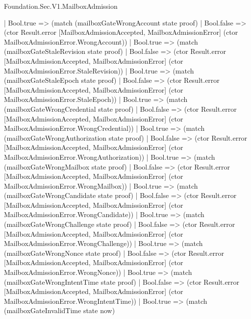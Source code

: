 \begin{lexlean}{Foundation.Sec.V1.MailboxAdmission}
\begin{semanticmodule}
{                        | Bool.true => (match (mailboxGateWrongAccount state proof)
                          | Bool.false => (ctor Result.error [MailboxAdmissionAccepted, MailboxAdmissionError] (ctor MailboxAdmissionError.WrongAccount))
                          | Bool.true => (match (mailboxGateStaleRevision state proof)
                            | Bool.false => (ctor Result.error [MailboxAdmissionAccepted, MailboxAdmissionError] (ctor MailboxAdmissionError.StaleRevision))
                            | Bool.true => (match (mailboxGateStaleEpoch state proof)
                              | Bool.false => (ctor Result.error [MailboxAdmissionAccepted, MailboxAdmissionError] (ctor MailboxAdmissionError.StaleEpoch))
                              | Bool.true => (match (mailboxGateWrongCredential state proof)
                                | Bool.false => (ctor Result.error [MailboxAdmissionAccepted, MailboxAdmissionError] (ctor MailboxAdmissionError.WrongCredential))
                                | Bool.true => (match (mailboxGateWrongAuthorization state proof)
                                  | Bool.false => (ctor Result.error [MailboxAdmissionAccepted, MailboxAdmissionError] (ctor MailboxAdmissionError.WrongAuthorization))
                                  | Bool.true => (match (mailboxGateWrongMailbox state proof)
                                    | Bool.false => (ctor Result.error [MailboxAdmissionAccepted, MailboxAdmissionError] (ctor MailboxAdmissionError.WrongMailbox))
                                    | Bool.true => (match (mailboxGateWrongCandidate state proof)
                                      | Bool.false => (ctor Result.error [MailboxAdmissionAccepted, MailboxAdmissionError] (ctor MailboxAdmissionError.WrongCandidate))
                                      | Bool.true => (match (mailboxGateWrongChallenge state proof)
                                        | Bool.false => (ctor Result.error [MailboxAdmissionAccepted, MailboxAdmissionError] (ctor MailboxAdmissionError.WrongChallenge))
                                        | Bool.true => (match (mailboxGateWrongNonce state proof)
                                          | Bool.false => (ctor Result.error [MailboxAdmissionAccepted, MailboxAdmissionError] (ctor MailboxAdmissionError.WrongNonce))
                                          | Bool.true => (match (mailboxGateWrongIntentTime state proof)
                                            | Bool.false => (ctor Result.error [MailboxAdmissionAccepted, MailboxAdmissionError] (ctor MailboxAdmissionError.WrongIntentTime))
                                            | Bool.true => (match (mailboxGateInvalidTime state now)
}
\end{semanticmodule}
\end{lexlean}
